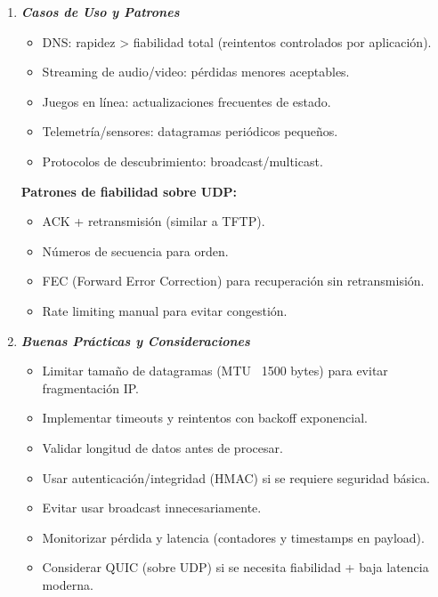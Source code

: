 \documentclass[12pt]{amsart}
\begin{document}
\begin{enumerate}
		\item \textbf{\textit{Casos de Uso y Patrones}}
		\medskip
		\begin{itemize}
		\item DNS: rapidez > fiabilidad total (reintentos controlados por aplicación).
		\item Streaming de audio/video: pérdidas menores aceptables.
		\item Juegos en línea: actualizaciones frecuentes de estado.
		\item Telemetría/sensores: datagramas periódicos pequeños.
		\item Protocolos de descubrimiento: broadcast/multicast.
		\end{itemize}

		\medskip \medskip 

		\noindent \textbf{Patrones de fiabilidad sobre UDP:}
		\medskip \medskip
		\begin{itemize}
		\item ACK + retransmisión (similar a TFTP).
		\item Números de secuencia para orden.
		\item FEC (Forward Error Correction) para recuperación sin retransmisión.
		\item Rate limiting manual para evitar congestión.
		\end{itemize}

		\bigskip \bigskip
		
		\item \textbf{\textit{Buenas Prácticas y Consideraciones}}
		\medskip
		\begin{itemize}
		\item Limitar tamaño de datagramas (\lt MTU ~1500 bytes) para evitar fragmentación IP.
		\item Implementar timeouts y reintentos con backoff exponencial.
		\item Validar longitud de datos antes de procesar.
		\item Usar autenticación/integridad (HMAC) si se requiere seguridad básica.
		\item Evitar usar broadcast innecesariamente.
		\item Monitorizar pérdida y latencia (contadores y timestamps en payload).
		\item Considerar QUIC (sobre UDP) si se necesita fiabilidad + baja latencia moderna.
		\end{itemize}


\end{enumerate}
\end{document}
